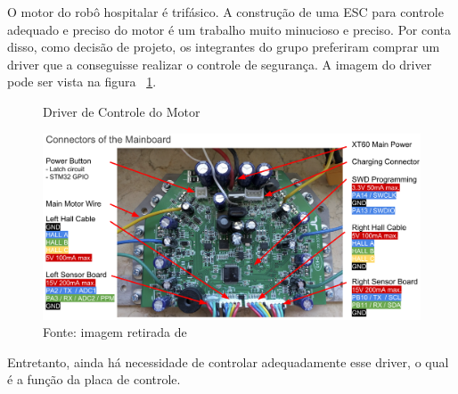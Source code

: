 \documentclass[../poliXuniversity_hospital_-USP-report.tex]{subfiles}
\begin{document}
O motor do robô hospitalar é trifásico. A construção de uma ESC para controle adequado e preciso do motor é um trabalho muito minucioso e preciso. Por conta disso, como decisão de projeto, os integrantes do grupo preferiram comprar um driver que a conseguisse realizar o controle de segurança. A imagem do driver pode ser vista na figura ~\ref{fig:Driver de Controle do Motor}.

\begin{figure}[h]
\centering
    \caption{Driver de Controle do Motor}
    \centering %
    \includegraphics[width=15cm]{driver_motor.png}
    \caption*{Fonte: imagem retirada de \cite{drivermotor21}}
    \label{fig:Driver de Controle do Motor}
\end{figure}

Entretanto, ainda há necessidade de controlar adequadamente esse driver, o qual é a função da placa de controle.
\end{document}
